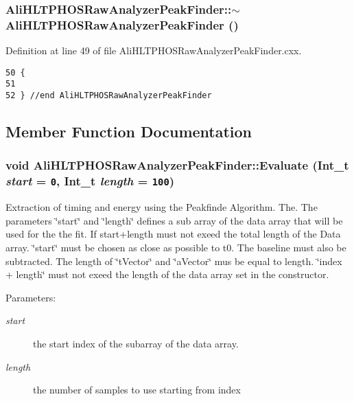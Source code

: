 \subsubsection{\setlength{\rightskip}{0pt plus 5cm}Ali\-HLTPHOSRaw\-Analyzer\-Peak\-Finder::$\sim${\bf Ali\-HLTPHOSRaw\-Analyzer\-Peak\-Finder} ()\hspace{0.3cm}{\tt  [virtual]}}\label{classAliHLTPHOSRawAnalyzerPeakFinder_a3}




Definition at line 49 of file Ali\-HLTPHOSRaw\-Analyzer\-Peak\-Finder.cxx.

\footnotesize\begin{verbatim}50 {
51 
52 } //end AliHLTPHOSRawAnalyzerPeakFinder
\end{verbatim}\normalsize 




\subsection{Member Function Documentation}
\subsubsection{\setlength{\rightskip}{0pt plus 5cm}void Ali\-HLTPHOSRaw\-Analyzer\-Peak\-Finder::Evaluate (Int\_\-t {\em start} = {\tt 0}, Int\_\-t {\em length} = {\tt 100})\hspace{0.3cm}{\tt  [virtual]}}\label{classAliHLTPHOSRawAnalyzerPeakFinder_a6}


Extraction of timing and energy using the Peakfinde Algorithm. The. The parameters \char`\"{}start\char`\"{} and \char`\"{}length\char`\"{} defines a sub array of the data array that will be used for the the fit. If start+length must not exeed the total length of the Data array. \char`\"{}start\char`\"{} must be chosen as close as possible to t0. The baseline must also be subtracted. The length of \char`\"{}t\-Vector\char`\"{} and \char`\"{}a\-Vector\char`\"{} mus be equal to length. \char`\"{}index + length\char`\"{} must not exeed the length of the data array set in the constructor. \begin{Desc}
\item[Parameters:]
\begin{description}
\item[{\em start}]the start index of the subarray of the data array. \item[{\em length}]the number of samples to use starting from index \end{description}
\end{Desc}



